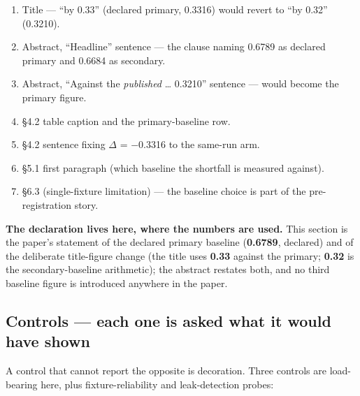 \documentclass[10pt]{article}
\begin{document}
\begin{enumerate}
\item Title --- ``by 0.33'' (declared primary, 0.3316) would revert to ``by 0.32'' (0.3210).
\item Abstract, ``Headline'' sentence --- the clause naming 0.6789 as declared primary and 0.6684 as secondary.
\item Abstract, ``Against the \emph{published} \ldots{} 0.3210'' sentence --- would become the primary figure.
\item \S4.2 table caption and the primary-baseline row.
\item \S4.2 sentence fixing $\Delta$ = $-$0.3316 to the same-run arm.
\item \S5.1 first paragraph (which baseline the shortfall is measured against).
\item \S6.3 (single-fixture limitation) --- the baseline choice is part of the pre-registration story.
\end{enumerate}

\textbf{The declaration lives here, where the numbers are used.} This section is the paper's statement of the declared primary baseline (\textbf{0.6789}, declared) and of the deliberate title-figure change (the title uses \textbf{0.33} against the primary; \textbf{0.32} is the secondary-baseline arithmetic); the abstract restates both, and no third baseline figure is introduced anywhere in the paper.

\subsection{Controls --- each one is asked what it would have shown}

A control that cannot report the opposite is decoration. Three controls are load-bearing here, plus fixture-reliability and leak-detection probes:
\end{document}
